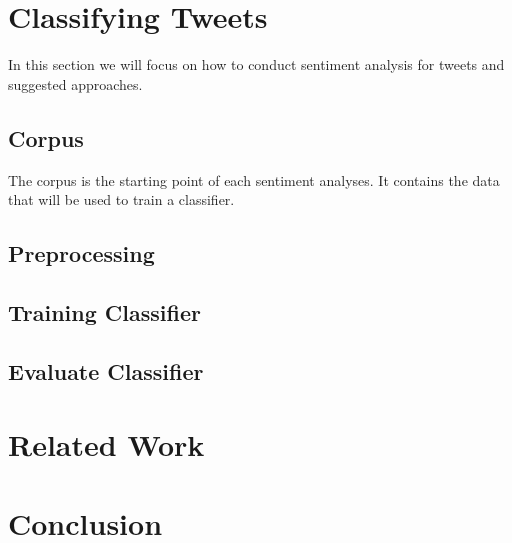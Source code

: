 \documentclass{acm_proc_article-sp}
\begin{document}
\section{Classifying Tweets}
In this section we will focus on how to conduct sentiment analysis for tweets and suggested approaches.

\subsection{Corpus}
The corpus is the starting point of each sentiment analyses. It contains the data that will be used to train a classifier.

\subsection{Preprocessing}

\subsection{Training Classifier}

\subsection{Evaluate Classifier}

\section{Related Work}


\section{Conclusion}




%

%
%
\end{document}

